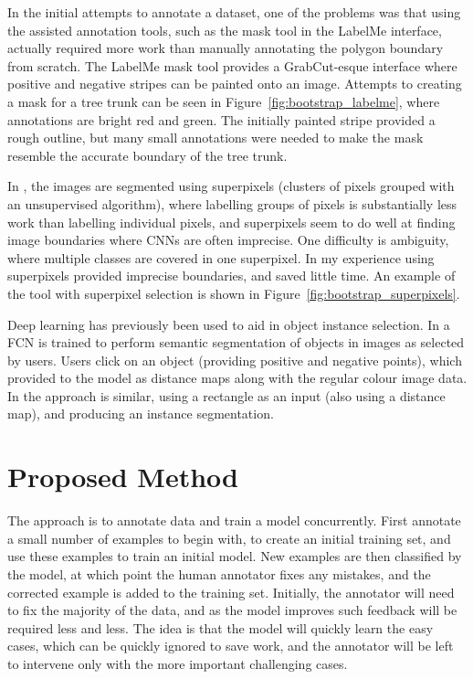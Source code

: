 In the initial attempts to annotate a dataset, one of the problems was that using the assisted annotation tools, such as the mask tool in the LabelMe \cite{Russell2007} interface, actually required more work than manually annotating the polygon boundary from scratch. The LabelMe mask tool provides a GrabCut-esque interface where positive and negative stripes can be painted onto an image. Attempts to creating a mask for a tree trunk can be seen in Figure~\ref{fig:bootstrap_labelme}, where annotations are bright red and green. The initially painted stripe provided a rough outline, but many small annotations were needed to make the mask resemble the accurate boundary of the tree trunk.

In \cite{Galloway2017}, the images are segmented using superpixels (clusters of pixels grouped with an unsupervised algorithm), where labelling groups of pixels is substantially less work than labelling individual pixels, and superpixels seem to do well at finding image boundaries where \gls{CNN}s are often imprecise. One difficulty is ambiguity, where multiple classes are covered in one superpixel. In my experience using superpixels provided imprecise boundaries, and saved little time. An example of the tool with superpixel selection is shown in Figure~\ref{fig:bootstrap_superpixels}.

Deep learning has previously been used to aid in object instance selection. In \cite{Xu2016} a \gls{FCN} is trained to perform semantic segmentation of objects in images as selected by users. Users click on an object (providing positive and negative points), which provided to the model as distance maps along with the regular colour image data. In \cite{Xu2017} the approach is similar, using a rectangle as an input (also using a distance map), and producing an instance segmentation.


\section{Proposed Method}

The approach is to annotate data and train a model concurrently. First annotate a small number of examples to begin with, to create an initial training set, and use these examples to train an initial model. New examples are then classified by the model, at which point the human annotator fixes any mistakes, and the corrected example is added to the training set. Initially, the annotator will need to fix the majority of the data, and as the model improves such feedback will be required less and less. The idea is that the model will quickly learn the easy cases, which can be quickly ignored to save work, and the annotator will be left to intervene only with the more important challenging cases.

